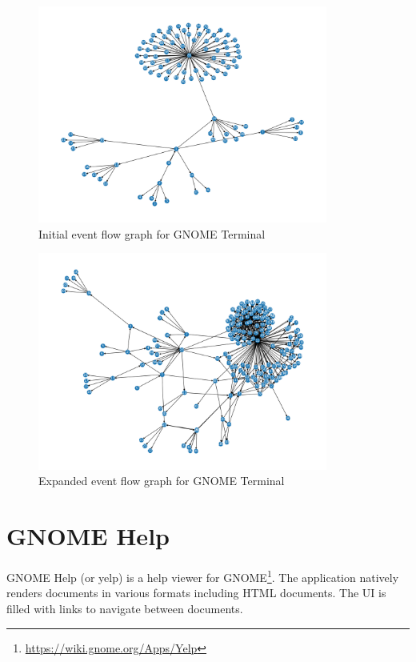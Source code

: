 \begin{figure}[H]
	\centering
	\includegraphics[width=0.85\textwidth,clip]{obrazky-figures/gnome-terminal_n_start.png}
	\caption{Initial event flow graph for GNOME Terminal}
	\label{gnome-terminal-graph1}
\end{figure}

\begin{figure}[H]
	\centering
	\includegraphics[width=0.85\textwidth,clip]{obrazky-figures/gnome-terminal_n_final.png}
	\caption{Expanded event flow graph for GNOME Terminal}
	\label{gnome-terminal-graph2}
\end{figure}

\section{GNOME Help}\label{}
GNOME Help (or yelp) is a help viewer for GNOME\footnote{\url{https://wiki.gnome.org/Apps/Yelp}}. The application natively renders documents in various formats including HTML documents. The UI is filled with links to navigate between documents.

